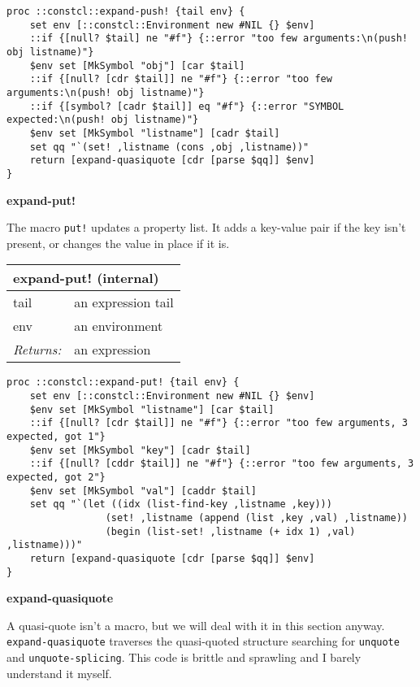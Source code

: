 \documentclass{report}
\begin{document}
\noindent\makebox[\linewidth]{\rule{\linewidth}{0.4pt}}
\begin{lstlisting}
proc ::constcl::expand-push! {tail env} {
    set env [::constcl::Environment new #NIL {} $env]
    ::if {[null? $tail] ne "#f"} {::error "too few arguments:\n(push! obj listname)"}
    $env set [MkSymbol "obj"] [car $tail]
    ::if {[null? [cdr $tail]] ne "#f"} {::error "too few arguments:\n(push! obj listname)"}
    ::if {[symbol? [cadr $tail]] eq "#f"} {::error "SYMBOL expected:\n(push! obj listname)"}
    $env set [MkSymbol "listname"] [cadr $tail]
    set qq "`(set! ,listname (cons ,obj ,listname))"
    return [expand-quasiquote [cdr [parse $qq]] $env]
}
\end{lstlisting}
\noindent\makebox[\linewidth]{\rule{\linewidth}{0.4pt}}

\textbf{expand-put!}


The macro \texttt{put!} updates a property list. It adds a key-value pair if the key isn't present, or changes the value in place if it is.

\begin{tabular}{ |l l| }
\hline
\multicolumn{2}{|l|}{expand-put! (internal)} \\
\hline
tail & an expression tail \\
env & an environment \\
\textit{Returns:} & an expression \\
\hline
\end{tabular}

\noindent\makebox[\linewidth]{\rule{\linewidth}{0.4pt}}
\begin{lstlisting}
proc ::constcl::expand-put! {tail env} {
    set env [::constcl::Environment new #NIL {} $env]
    $env set [MkSymbol "listname"] [car $tail]
    ::if {[null? [cdr $tail]] ne "#f"} {::error "too few arguments, 3 expected, got 1"}
    $env set [MkSymbol "key"] [cadr $tail]
    ::if {[null? [cddr $tail]] ne "#f"} {::error "too few arguments, 3 expected, got 2"}
    $env set [MkSymbol "val"] [caddr $tail]
    set qq "`(let ((idx (list-find-key ,listname ,key)))
                 (set! ,listname (append (list ,key ,val) ,listname))
                 (begin (list-set! ,listname (+ idx 1) ,val) ,listname)))"
    return [expand-quasiquote [cdr [parse $qq]] $env]
}
\end{lstlisting}
\noindent\makebox[\linewidth]{\rule{\linewidth}{0.4pt}}

\textbf{expand-quasiquote}


A quasi-quote isn't a macro, but we will deal with it in this section anyway. \texttt{expand-quasiquote} traverses the quasi-quoted structure searching for \texttt{unquote} and \texttt{unquote-splicing}. This code is brittle and sprawling and I barely understand it myself.
\end{document}

